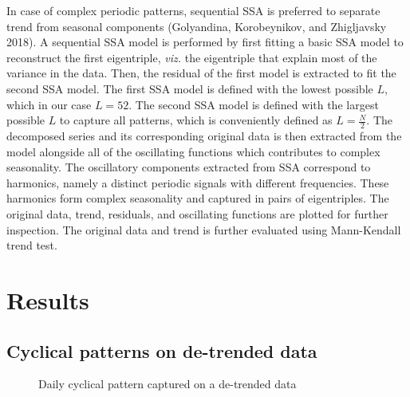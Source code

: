 \documentclass[
  letterpaper,
  DIV=11,
  numbers=noendperiod]{scrartcl}
\newcommand*\uselandscape{%
  \cleardoublepage
  \KOMAoptions{paper=landscape}%
  \recalctypearea
  \areaset{1.2\textwidth}{1.2\textheight}%
}
\begin{document}
In case of complex periodic patterns, sequential SSA is preferred to
separate trend from seasonal components (Golyandina, Korobeynikov, and
Zhigljavsky 2018). A sequential SSA model is performed by first fitting
a basic SSA model to reconstruct the first eigentriple, \emph{viz.} the
eigentriple that explain most of the variance in the data. Then, the
residual of the first model is extracted to fit the second SSA model.
The first SSA model is defined with the lowest possible \(L\), which in
our case \(L = 52\). The second SSA model is defined with the largest
possible \(L\) to capture all patterns, which is conveniently defined as
\(L = \frac{N}{2}\). The decomposed series and its corresponding
original data is then extracted from the model alongside all of the
oscillating functions which contributes to complex seasonality. The
oscillatory components extracted from SSA correspond to harmonics,
namely a distinct periodic signals with different frequencies. These
harmonics form complex seasonality and captured in pairs of
eigentriples. The original data, trend, residuals, and oscillating
functions are plotted for further inspection. The original data and
trend is further evaluated using Mann-Kendall trend test.

\uselandscape

\section{Results}\label{results}

\subsection{Cyclical patterns on de-trended
data}\label{cyclical-patterns-on-de-trended-data}

\begin{figure}


\caption{\label{fig-period-day}Daily cyclical pattern captured on a
de-trended data}

\end{figure}%
\end{document}
